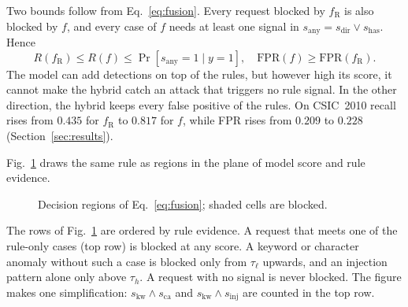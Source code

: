 \documentclass[preprint,11pt]{elsarticle}
\begin{document}
Two bounds follow from Eq.~\eqref{eq:fusion}. Every request blocked by
$f_{\text{R}}$ is also blocked by $f$, and every case of $f$ needs at least
one signal in $s_{\text{any}}=s_{\text{dir}}\vee s_{\text{has}}$. Hence
\begin{equation}
R(f_{\text{R}})\le R(f)\le \Pr[s_{\text{any}}=1\mid y=1],\quad
\mathrm{FPR}(f)\ge \mathrm{FPR}(f_{\text{R}}).
\label{eq:bounds}
\end{equation}
The model can add detections on top of the rules, but however high its
score, it cannot make the hybrid catch an attack that triggers no rule
signal. In the other direction, the hybrid keeps every false positive of
the rules. On CSIC~2010 recall rises from $0.435$ for $f_{\text{R}}$ to
$0.817$ for $f$, while FPR rises from $0.209$ to $0.228$
(Section~\ref{sec:results}).

Fig.~\ref{fig:regions} draws the same rule as regions in the plane of model
score and rule evidence.

\begin{figure}[t]
\centering
{}
\caption{Decision regions of Eq.~\eqref{eq:fusion}; shaded cells are blocked.}
\label{fig:regions}
\end{figure}

The rows of Fig.~\ref{fig:regions} are ordered by rule evidence. A request
that meets one of the rule-only cases (top row) is blocked at any score. A
keyword or character anomaly without such a case is blocked only from
$\tau_\ell$ upwards, and an injection pattern alone only above $\tau_h$. A
request with no signal is never blocked. The figure makes one
simplification: $s_{\text{kw}}\wedge s_{\text{ca}}$ and
$s_{\text{kw}}\wedge s_{\text{inj}}$ are counted in the top row.
\end{document}
